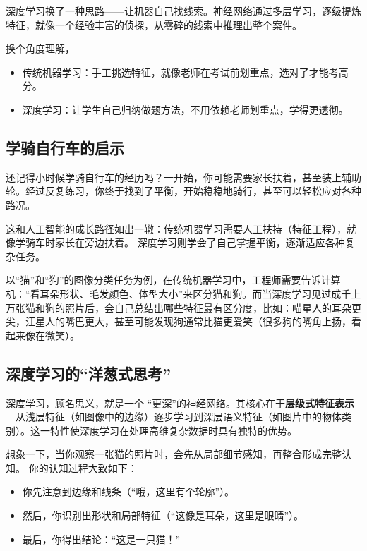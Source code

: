 深度学习换了一种思路——让机器自己找线索。神经网络通过多层学习，逐级提炼特征，就像一个经验丰富的侦探，从零碎的线索中推理出整个案件。

换个角度理解，
\begin{itemize}
    \item 传统机器学习：手工挑选特征，就像老师在考试前划重点，选对了才能考高分。
    \item 深度学习：让学生自己归纳做题方法，不用依赖老师划重点，学得更透彻。
\end{itemize}

\subsection{学骑自行车的启示}
还记得小时候学骑自行车的经历吗？一开始，你可能需要家长扶着，甚至装上辅助轮。经过反复练习，你终于找到了平衡，开始稳稳地骑行，甚至可以轻松应对各种路况。

这和人工智能的成长路径如出一辙：传统机器学习需要人工扶持（特征工程），就像学骑车时家长在旁边扶着。
深度学习则学会了自己掌握平衡，逐渐适应各种复杂任务。

以“猫”和“狗”的图像分类任务为例，在传统机器学习中，工程师需要告诉计算机：“看耳朵形状、毛发颜色、体型大小”来区分猫和狗。而当深度学习见过成千上万张猫和狗的照片后，会自己总结出哪些特征最有区分度，比如：喵星人的耳朵更尖，汪星人的嘴巴更大，甚至可能发现狗通常比猫更爱笑（很多狗的嘴角上扬，看起来像在微笑）。


\subsection{ 深度学习的“洋葱式思考”}
深度学习，顾名思义，就是一个 “更深”的神经网络。其核心在于\textbf{层级式特征表示}---从浅层特征（如图像中的边缘）逐步学习到深层语义特征（如图片中的物体类别）。这一特性使深度学习在处理高维复杂数据时具有独特的优势。

想象一下，当你观察一张猫的照片时，会先从局部细节感知，再整合形成完整认知。
你的认知过程大致如下：
\begin{itemize}
   \item 你先注意到边缘和线条（“哦，这里有个轮廓”）。
  \item 然后，你识别出形状和局部特征（“这像是耳朵，这里是眼睛”）。  
  \item  最后，你得出结论：“这是一只猫！”
\end{itemize}

